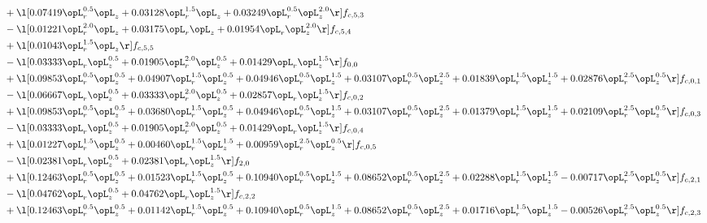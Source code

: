 \begin{alignat}{2}
& + \l[  0.07419 \opL_r^{0.5} \opL_z +  0.03128 \opL_r^{1.5} \opL_z +  0.03249 \opL_r^{0.5} \opL_z^{2.0}  \r] f_{c,5,3} \nonumber \\ 
& - \l[  0.01221 \opL_r^{2.0} \opL_z +  0.03175 \opL_r \opL_z +  0.01954 \opL_r \opL_z^{2.0}  \r] f_{c,5,4} \nonumber \\ 
& + \l[  0.01043 \opL_r^{1.5} \opL_z  \r] f_{c,5,5} \nonumber \\ 
& - \l[  0.03333 \opL_r \opL_z^{0.5} +  0.01905 \opL_r^{2.0} \opL_z^{0.5} +  0.01429 \opL_r \opL_z^{1.5}  \r] f_{0,0} \nonumber \\ 
& + \l[  0.09853 \opL_r^{0.5} \opL_z^{0.5} +  0.04907 \opL_r^{1.5} \opL_z^{0.5} +  0.04946 \opL_r^{0.5} \opL_z^{1.5} +  0.03107 \opL_r^{0.5} \opL_z^{2.5} +  0.01839 \opL_r^{1.5} \opL_z^{1.5} +  0.02876 \opL_r^{2.5} \opL_z^{0.5}  \r] f_{c,0,1} \nonumber \\ 
& - \l[  0.06667 \opL_r \opL_z^{0.5} +  0.03333 \opL_r^{2.0} \opL_z^{0.5} +  0.02857 \opL_r \opL_z^{1.5}  \r] f_{c,0,2} \nonumber \\ 
& + \l[  0.09853 \opL_r^{0.5} \opL_z^{0.5} +  0.03680 \opL_r^{1.5} \opL_z^{0.5} +  0.04946 \opL_r^{0.5} \opL_z^{1.5} +  0.03107 \opL_r^{0.5} \opL_z^{2.5} +  0.01379 \opL_r^{1.5} \opL_z^{1.5} +  0.02109 \opL_r^{2.5} \opL_z^{0.5}  \r] f_{c,0,3} \nonumber \\ 
& - \l[  0.03333 \opL_r \opL_z^{0.5} +  0.01905 \opL_r^{2.0} \opL_z^{0.5} +  0.01429 \opL_r \opL_z^{1.5}  \r] f_{c,0,4} \nonumber \\ 
& + \l[  0.01227 \opL_r^{1.5} \opL_z^{0.5} +  0.00460 \opL_r^{1.5} \opL_z^{1.5} +  0.00959 \opL_r^{2.5} \opL_z^{0.5}  \r] f_{c,0,5} \nonumber \\ 
& - \l[  0.02381 \opL_r \opL_z^{0.5} +  0.02381 \opL_r \opL_z^{1.5}  \r] f_{2,0} \nonumber \\ 
& + \l[  0.12463 \opL_r^{0.5} \opL_z^{0.5} +  0.01523 \opL_r^{1.5} \opL_z^{0.5} +  0.10940 \opL_r^{0.5} \opL_z^{1.5} +  0.08652 \opL_r^{0.5} \opL_z^{2.5} +  0.02288 \opL_r^{1.5} \opL_z^{1.5}   -0.00717 \opL_r^{2.5} \opL_z^{0.5}  \r] f_{c,2,1} \nonumber \\ 
& - \l[  0.04762 \opL_r \opL_z^{0.5} +  0.04762 \opL_r \opL_z^{1.5}  \r] f_{c,2,2} \nonumber \\ 
& + \l[  0.12463 \opL_r^{0.5} \opL_z^{0.5} +  0.01142 \opL_r^{1.5} \opL_z^{0.5} +  0.10940 \opL_r^{0.5} \opL_z^{1.5} +  0.08652 \opL_r^{0.5} \opL_z^{2.5} +  0.01716 \opL_r^{1.5} \opL_z^{1.5}   -0.00526 \opL_r^{2.5} \opL_z^{0.5}  \r] f_{c,2,3} \nonumber \\ 

\end{alignat}
